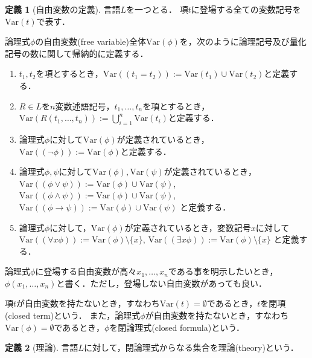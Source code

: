 \documentclass[uplatex, dvipdfmx]{jsarticle}
\newcommand{\Var}{\mathrm{Var}}
\theoremstyle{definition}
\newtheorem{definition}{定義}[section]
\begin{document}
\begin{definition}[自由変数の定義]
     言語$L$を一つとる．
     項$t$に登場する全ての変数記号を$\Var(t)$で表す．

     論理式$\phi$の自由変数(free variable)全体$\Var(\phi)$を，次のように論理記号及び量化記号の数に関して帰納的に定義する．
     \begin{enumerate}
          \item $t_1, t_2$を項とするとき，$\Var((t_1=t_2)):=\Var(t_1)\cup\Var(t_2)$と定義する．
          \item $R \in L$を$n$変数述語記号，$t_1, \dots, t_n$を項とするとき，$\Var(R(t_1, \dots, t_n)):= \bigcup_{i=1}^n \Var(t_i)$と定義する．
          \item 論理式$\phi$に対して$\Var(\phi)$が定義されているとき，$\Var((\lnot \phi)):=\Var(\phi)$と定義する．
          \item 論理式$\phi, \psi$に対して$\Var(\phi), \Var(\psi)$が定義されているとき，
          $\Var((\phi \lor \psi)):=\Var(\phi)\cup\Var(\psi)$,
          $\Var((\phi \land \psi)):=\Var(\phi)\cup\Var(\psi)$,
          $\Var((\phi \rightarrow \psi)):=\Var(\phi)\cup\Var(\psi)$
          と定義する．
          \item 論理式$\phi$に対して，$\Var(\phi)$が定義されているとき，変数記号$x$に対して
          $\Var((\forall x\phi)):=\Var(\phi) \setminus \{x\}$,
          $\Var((\exists x\phi)):=\Var(\phi) \setminus \{x\}$
          と定義する．
     \end{enumerate}

     論理式$\phi$に登場する自由変数が高々$x_1, \dots, x_n$である事を明示したいとき，$\phi(x_1, \dots, x_n)$と書く．ただし，登場しない自由変数があっても良い．

     項$t$が自由変数を持たないとき，すなわち$\Var(t)=\emptyset$であるとき，$t$を閉項(closed term)という．
     また，論理式$\phi$が自由変数を持たないとき，すなわち$\Var(\phi)=\emptyset$であるとき，$\phi$を閉論理式(closed formula)という．
\end{definition}

\begin{definition}[理論]
     言語$L$に対して，閉論理式からなる集合を理論(theory)という．
\end{definition}
\end{document}
